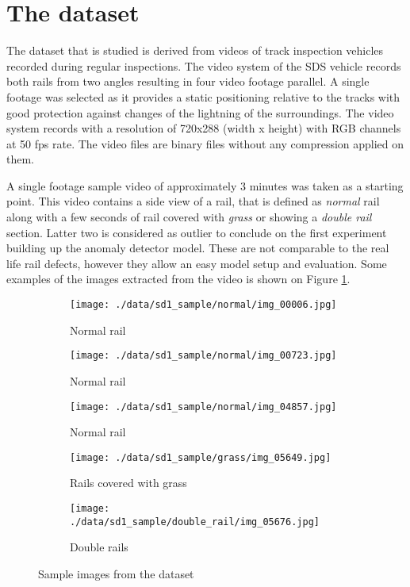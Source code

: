 \section{The dataset} \label{dataset}
The dataset that is studied is derived from videos of track inspection vehicles recorded during regular
inspections.
The video system of the SDS vehicle records both rails from two angles resulting in four video footage
parallel.
A single footage was selected as it provides a static positioning relative to the tracks with good
protection against changes of the lightning of the surroundings.
The video system records with a resolution of 720x288 (width x height) with RGB channels
at 50 fps rate.
The video files are binary files without any compression applied on them.

A single footage sample video of approximately 3 minutes was taken as a starting point.
This video contains a side view of a rail, that is defined as \emph{normal} rail
along with a few seconds of rail covered with \emph{grass} or showing a \emph{double rail} section.
Latter two is considered as outlier to conclude on the first experiment building up the anomaly
detector model.
These are not comparable to the real life rail defects, however they allow an easy model setup and
evaluation.
Some examples of the images extracted from the video is shown on Figure \ref{fig:example_images}.

\begin{figure}[!ht]
    \centering
    \begin{subfigure}{0.3\textwidth}
        \centering
        \texttt{[image: ./data/sd1\_sample/normal/img\_00006.jpg]}
        \caption*{Normal rail}
    \end{subfigure}
    \begin{subfigure}{0.3\textwidth}
        \centering
        \texttt{[image: ./data/sd1\_sample/normal/img\_00723.jpg]}
        \caption*{Normal rail}
    \end{subfigure}
    \begin{subfigure}{0.3\textwidth}
        \centering
        \texttt{[image: ./data/sd1\_sample/normal/img\_04857.jpg]}
        \caption*{Normal rail}
    \end{subfigure}
    \begin{subfigure}{0.3\textwidth}
        \centering
        \texttt{[image: ./data/sd1\_sample/grass/img\_05649.jpg]}
        \caption*{Rails covered with grass}
    \end{subfigure}
    \begin{subfigure}{0.3\textwidth}
        \centering
        \texttt{[image: ./data/sd1\_sample/double\_rail/img\_05676.jpg]}
        \caption*{Double rails}
    \end{subfigure}
    \caption{Sample images from the dataset}
    \label{fig:example_images}
\end{figure}

